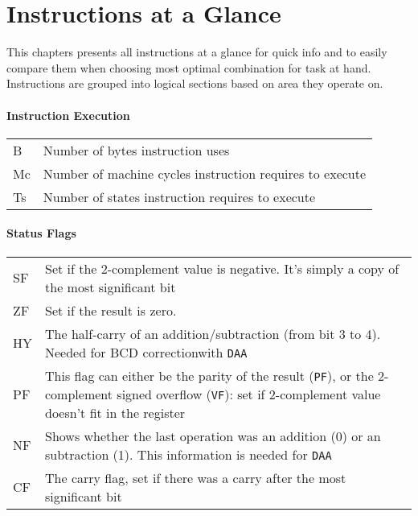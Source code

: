 \documentclass[12pt,twoside,openright,a4paper]{book}
\newcommand{\notet}{\rule{0pt}{2.4ex}}
\begin{document}
\chapter{Instructions at a Glance}

This chapters presents all instructions at a glance for quick info and to easily compare them when choosing most optimal combination for task at hand. Instructions are grouped into logical sections based on area they operate on.

\minitoc

\pagebreak

\newcommand{\FS}{$\updownarrow$} %
\newcommand{\FN}{-} %
\newcommand{\FU}{?} %
\newcommand{\FX}{$\bullet$}
\newcommand{\FPV}{VF} %
\newcommand{\FPP}{PF} %

\subsubsection{Instruction Execution}

\begin{tabular}{ll}
	B & 
		Number of bytes instruction uses \\
	Mc\notet & 
		Number of machine cycles instruction requires to execute \\
	Ts\notet & 
		Number of states instruction requires to execute \\
\end{tabular}

\subsubsection{Status Flags}

\begin{tabular}{lp{13cm}}
	SF & 
		Set if the 2-complement value is negative.  It’s simply a copy of the most significant bit \\
	ZF\notet & 
		Set if the result is zero. \\
	HY\notet & 
		The half-carry of an addition/subtraction (from bit 3 to 4). Needed for BCD correctionwith {\tt DAA} \\
	PF\notet & 
		This flag can either be the parity of the result ({\tt PF}), or the 2-complement signed overflow ({\tt VF}): set if 2-complement value doesn’t fit in the register \\
	NF\notet & 
		Shows whether the last operation was an addition (0) or an subtraction  (1). This information is needed for {\tt DAA} \\
	CF\notet & 
		The carry flag, set if there was a carry after the most significant bit \\
\end{tabular}
\end{document}
